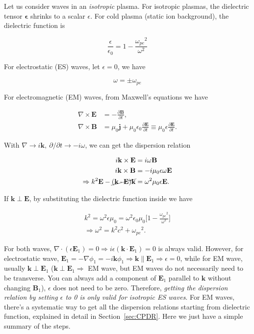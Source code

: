 \documentclass[
  notoc %
]{tufte-book}
\begin{document}
Let us consider waves in an \emph{isotropic} plasma. For isotropic
plasmas, the dielectric tensor \(\pmb{\epsilon}\) shrinks to a scalar
\(\epsilon\). For cold plasma (static ion background), the dielectric
function is

\[
\frac{\epsilon}{\epsilon_0}=1-\frac{{\omega_{pe}}^2}{\omega^2}
\]

For electrostatic (ES) waves, let \(\epsilon=0\), we have

\[
\omega=\pm\omega_{pe}
\]

For electromagnetic (EM) waves, from Maxwell's equations we have

\[
\begin{aligned}
\nabla\times\mathbf{E}&=-\frac{\partial \mathbf{B}}{\partial t}, \\
\nabla\times\mathbf{B}&=\mu_0\mathbf{j}+\mu_0\epsilon_0\frac{\partial\mathbf{E}}{\partial t}\equiv\mu_0\epsilon\frac{\partial \mathbf{E}}{\partial t}.
\end{aligned}
\]

With
\(\nabla\rightarrow i\mathbf{k},\ \partial/\partial t\rightarrow -i\omega\),
we can get the dispersion relation

\[
\begin{aligned}
i\mathbf{k}\times\mathbf{E}&=i\omega \mathbf{B} \\
i\mathbf{k}\times\mathbf{B}&=-i\mu_0\epsilon\omega\mathbf{E} \\
\Rightarrow k^2\mathbf{E}-\cancel{(\mathbf{k}\cdot\mathbf{E})\mathbf{k}}&=\omega^2 \mu_0\epsilon \mathbf{E}.
\end{aligned}
\]

If \(\mathbf{k}\perp\mathbf{E}\), by substituting the dielectric
function inside we have

\[
\begin{aligned}
k^2=\omega^2 \epsilon\mu_0=\omega^2\epsilon_0\mu_0\Big[ 1-\frac{{\omega_{pe}}^2}{\omega^2}\Big] \nonumber \\
\Rightarrow \omega^2=k^2c^2+{\omega_{pe}}^2.
\end{aligned}
\]

For both waves,
\(\nabla\cdot(\epsilon\mathbf{E}_1)=0\Rightarrow i\epsilon(\mathbf{k}\cdot\mathbf{E}_1)=0\)
is always valid. However, for electrostatic wave,
\(\mathbf{E}_1=-\nabla\phi_1=-i\mathbf{k}\phi_1\Rightarrow \mathbf{k}\parallel \mathbf{E}_1\Rightarrow \epsilon=0\),
while for EM wave, usually \(\mathbf{k}\perp\mathbf{E}_1\)
(\(\mathbf{k}\perp\mathbf{E}_1 \Rightarrow\) EM wave, but EM waves do
not necessarily need to be transverse. You can always add a component of
\(\mathbf{E}_1\) parallel to \(\mathbf{k}\) without changing
\(\mathbf{B}_1\)), \(\epsilon\) does not need to be zero. Therefore,
\emph{getting the dispersion relation by setting \(\epsilon\) to 0 is
only valid for isotropic ES waves}. For EM waves, there's a systematic
way to get all the dispersion relations starting from dielectric
function, explained in detail in Section~\ref{sec:CPDR}. Here we just
have a simple summary of the steps.
\end{document}
